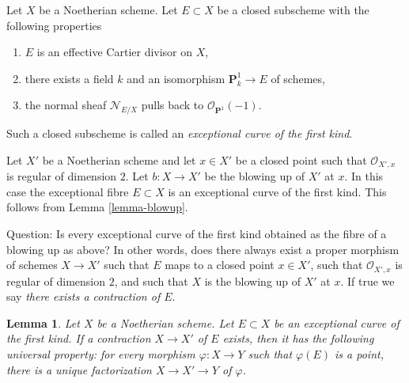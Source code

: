 \documentclass{stacks-project}
\theoremstyle{plain}
\newtheorem{lemma}[subsection]{Lemma}
\theoremstyle{definition}
\theoremstyle{remark}
\numberwithin{equation}{subsection}
\begin{document}
\noindent
Let $X$ be a Noetherian scheme. Let $E \subset X$ be a closed
subscheme with the following properties
\begin{enumerate}
\item $E$ is an effective Cartier divisor on $X$,
\item there exists a field $k$ and an isomorphism $\mathbf{P}^1_k \to E$
of schemes,
\item the normal sheaf $\mathcal{N}_{E/X}$ pulls back to
$\mathcal{O}_{\mathbf{P}^1}(-1)$.
\end{enumerate}
Such a closed subscheme is called an {\it exceptional curve of the first kind}.

\medskip\noindent
Let $X'$ be a Noetherian scheme and let $x \in X'$ be a closed point
such that $\mathcal{O}_{X', x}$ is regular of dimension $2$. Let
$b : X \to X'$ be the blowing up of $X'$ at $x$. In this case the
exceptional fibre $E \subset X$ is an exceptional curve of the first
kind. This follows from Lemma \ref{lemma-blowup}.

\medskip\noindent
Question: Is every exceptional curve of the first kind obtained
as the fibre of a blowing up as above? In other words, does there
always exist a proper morphism of schemes $X \to X'$ such that
$E$ maps to a closed point $x \in X'$, such that $\mathcal{O}_{X', x}$
is regular of dimension $2$, and such that $X$ is the blowing up
of $X'$ at $x$. If true we say {\it there exists a contraction of $E$}.

\begin{lemma}
\label{lemma-factor-through-contraction}
Let $X$ be a Noetherian scheme. Let $E \subset X$ be an
exceptional curve of the first kind. If a contraction $X \to X'$
of $E$ exists, then it has the following universal property:
for every morphism $\varphi : X \to Y$ such that $\varphi(E)$
is a point, there is a unique factorization
$X \to X' \to Y$ of $\varphi$.
\end{lemma}
\end{document}
